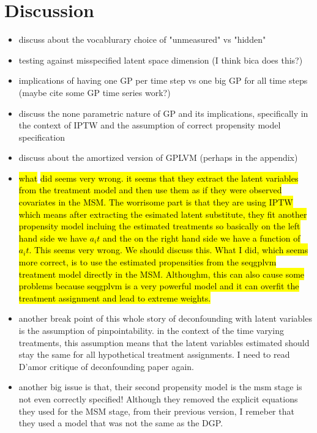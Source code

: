 \chapter{Discussion}
\label{chap:discussion}
\begin{itemize}
    \item discuss about the vocablurary choice of "unmeasured" vs "hidden"
    \item testing against misspecified latent space dimension (I think bica does this?)
    \item implications of having one GP per time step vs one big GP for all time steps (maybe cite 
    some GP time series work?)
    \item discuss the none parametric nature of GP and its implications, specifically in the context of IPTW and the assumption of correct propensity model specification
    \item discuss about the amortized version of GPLVM (perhaps in the appendix)
    \item \hl{what} \cite{hattSequentialDeconfoundingCausal2024} \hl{did seems very wrong. it seems that they extract the latent variables from the treatment model and then use them as if they were observed covariates in the MSM. The worrisome part is that they are using IPTW which means after extracting the esimated latent substitute, they fit another propensity model incluing the estimated treatments so basically on the left hand side we have $a_it$ and the on the right hand side we have a function of $a_it$. This seems very wrong. We should discuss this. What I did, which seems more correct, is to use the estimated propensities from the seqgplvm treatment model directly in the MSM. Althoughm, this can also cause some problems because seqgplvm is a very powerful model and it can overfit the treatment assignment and lead to extreme weights.}
    \item another break point of this whole story of deconfounding with latent variables is the assumption of pinpointability. in the context of the time varying treatments, this assumption means that the latent variables estimated should stay the same for all hypothetical treatment assignments. I need to read D'amor critique of deconfounding paper again. 
    \item another big issue is that, their second propensity model is the msm stage is not even correctly specified! Although they removed the explicit equations they used for the MSM stage, from their previous version, I remeber that they used a model that was not the same as the DGP. 

\end{itemize}
